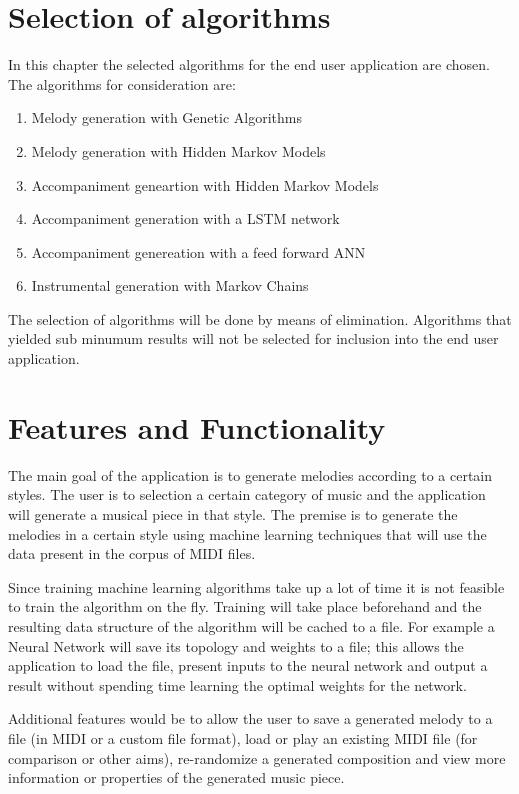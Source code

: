 \chapter{Selection of algorithms}
In this chapter the selected algorithms for the end user application are chosen.
The algorithms for consideration are:
\begin{enumerate}
\item Melody generation with Genetic Algorithms
\item Melody generation with Hidden Markov Models
\item Accompaniment geneartion with Hidden Markov Models
\item Accompaniment generation with a \ac{LSTM} network
\item Accompaniment genereation with a feed forward \ac{ANN}
\item Instrumental generation with Markov Chains
\end{enumerate}

The selection of algorithms will be done by means of elimination. Algorithms that yielded sub minumum results will not be selected for inclusion into the end user application.

\chapter{Features and Functionality}
The main goal of the application is to generate melodies according to a certain styles. The user is to selection a certain category of music and the application will generate a musical piece in that style. The premise is to generate the melodies in a certain style using machine learning techniques that will use the data present in the corpus of MIDI files. 

Since training machine learning algorithms take up a lot of time it is not feasible to train the algorithm on the fly. Training will take place beforehand and the resulting data structure of the algorithm will be cached to a file. 
For example a Neural Network will save its topology and weights to a file; this allows the application to load the file, present inputs to the neural network and output a result without spending time learning the optimal weights for the network.

Additional features would be to allow the user to save a generated melody to a file (in \ac{MIDI} or a custom file format), load or play an existing \ac{MIDI} file (for comparison or other aims), re-randomize a generated composition and view more information or properties of the generated music piece.

